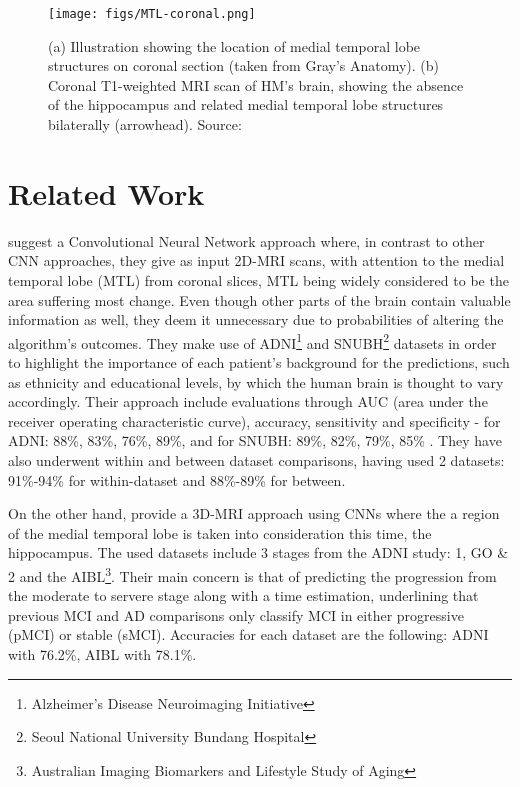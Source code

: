 \documentclass[a4paper, 12pt]{article}
\begin{document}
\begin{figure}[htbp]
    \centering
    \texttt{[image: figs/MTL-coronal.png]}
    \caption{(a) Illustration showing the location of medial temporal lobe structures on coronal section
        (taken from Gray's Anatomy). (b) Coronal T1-weighted MRI scan of HM's brain, showing the absence of the
        hippocampus and related medial temporal lobe structures bilaterally (arrowhead). Source: \cite{MTL-image}}
    \label{fig:MTL}
\end{figure}


\newpage
\newpage

\section{Related Work} %
\cite{bae2020} suggest a Convolutional Neural Network approach where, in contrast to other CNN approaches, they give as input
2D-MRI scans, with attention to the medial temporal lobe (MTL) from coronal slices, MTL being widely considered to be the
area suffering most change. Even though other parts of the brain contain valuable information as well, they deem it
unnecessary due to probabilities of altering the algorithm's outcomes. They make use of ADNI\footnote{Alzheimer's Disease Neuroimaging Initiative}
and SNUBH\footnote{Seoul National University Bundang Hospital} datasets in order to highlight the importance of each patient's background for
the predictions, such as ethnicity and educational levels, by which the human brain is thought to vary accordingly.
Their approach include evaluations through AUC (area under the receiver operating characteristic curve), accuracy, sensitivity and specificity
- for ADNI: 88\%, 83\%, 76\%, 89\%, and for SNUBH: 89\%, 82\%, 79\%, 85\% . They have also underwent within and between dataset comparisons,
having used 2 datasets: 91\%-94\% for within-dataset and 88\%-89\% for between.

On the other hand, \cite{PMID-31201098} provide a 3D-MRI approach using CNNs where the a region of the medial temporal lobe
is taken into consideration this time, the hippocampus. The used datasets include 3 stages from the ADNI study: 1, GO \& 2 and
the AIBL\footnote{Australian Imaging Biomarkers and Lifestyle Study of Aging}. Their main concern is that of predicting the
progression from the moderate to servere stage along with a time estimation, underlining that previous MCI and AD comparisons
only classify MCI in either progressive (pMCI) or stable (sMCI). Accuracies for each dataset are the following: ADNI with
76.2\%, AIBL with 78.1\%.
\end{document}

